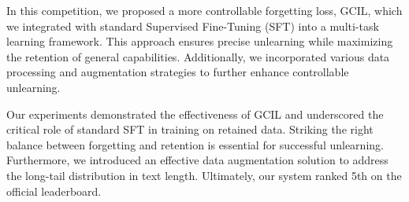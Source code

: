 \documentclass[11pt]{article}
\begin{document}

In this competition, we proposed a more controllable forgetting loss, GCIL, which we integrated with standard Supervised Fine-Tuning (SFT) into a multi-task learning framework. This approach ensures precise unlearning while maximizing the retention of general capabilities. Additionally, we incorporated various data processing and augmentation strategies to further enhance controllable unlearning.

Our experiments demonstrated the effectiveness of GCIL and underscored the critical role of standard SFT in training on retained data. Striking the right balance between forgetting and retention is essential for successful unlearning. Furthermore, we introduced an effective data augmentation solution to address the long-tail distribution in text length. Ultimately, our system ranked 5th on the official leaderboard.



\end{document}
